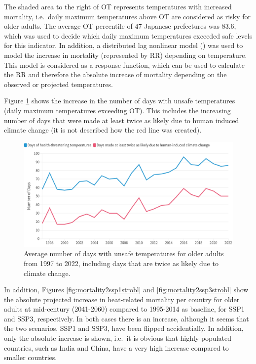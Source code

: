 \documentclass[
]{krantz}
\begin{document}
The shaded area to the right of OT represents temperatures with increased mortality, i.e.~daily maximum temperatures above OT are considered as risky for older adults. The average OT percentile of 47 Japanese prefectures was 83.6, which was used to decide which daily maximum temperatures exceeded safe levels for this indicator. In addition, a distributed lag nonlinear model (\citet{Armstrong2006-mv}) was used to model the increase in mortality (represented by RR) depending on temperature. This model is considered as a response function, which can be used to calculate the RR and therefore the absolute increase of mortality depending on the observed or projected temperatures.

Figure \ref{fig:mortality1strobl} shows the increase in the number of days with unsafe temperatures (daily maximum temperatures exceeding OT). This includes the increasing number of days that were made at least twice as likely due to human induced climate change (it is not described how the red line was created).

\begin{figure}
\includegraphics[width=1\linewidth]{work/08-lancet/figures/indicator_2_1} \caption{Average number of days with unsafe temperatures for older adults from 1997 to 2022, including days that are twice as likely due to climate change.}\label{fig:mortality1strobl}
\end{figure}

In addition, Figures \ref{fig:mortality2ssp1strobl} and \ref{fig:mortality2ssp3strobl} show the absolute projected increase in heat-related mortality per country for older adults at mid-century (2041-2060) compared to 1995-2014 as baseline, for SSP1 and SSP3, respectively. In both cases there is an increase, although it seems that the two scenarios, SSP1 and SSP3, have been flipped accidentially. In addition, only the absolute increase is shown, i.e.~it is obvious that highly populated countries, such as India and China, have a very high increase compared to smaller countries.
\end{document}
